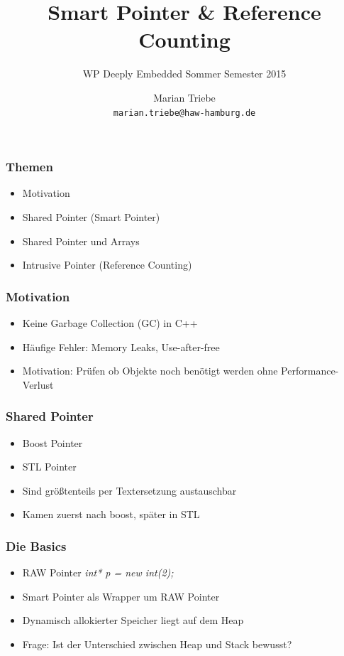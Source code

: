 \documentclass{beamer}
\title{Smart Pointer \& Reference Counting}
\author{
  Marian Triebe\\
  \tiny \texttt{marian.triebe@haw-hamburg.de}
}
\date{} %
\subtitle{WP Deeply Embedded Sommer Semester 2015}
\begin{document}
\begin{frame}
 \titlepage
\end{frame}
 
\begin{frame}
 \frametitle{Themen}
 \begin{itemize}
  \item Motivation
  \item Shared Pointer (Smart Pointer)
  \item Shared Pointer und Arrays
  \item Intrusive Pointer (Reference Counting)
 \end{itemize}
\end{frame}

\begin{frame}
 \frametitle{Motivation}
 \begin{itemize}
 	\item Keine Garbage Collection (GC) in C++
 	\item Häufige Fehler: Memory Leaks, Use-after-free
 	\item Motivation: Prüfen ob Objekte noch benötigt werden ohne
 	Performance-Verlust
 \end{itemize}
\end{frame}


\begin{frame}
 \frametitle{Shared Pointer}
 \begin{itemize}
  \item Boost Pointer
  \item STL Pointer
  \item Sind größtenteils per Textersetzung austauschbar
  \item Kamen zuerst nach boost, später in STL
 \end{itemize}
\end{frame}

\begin{frame}
  \frametitle{Die Basics}
  \begin{itemize}
    \item RAW Pointer \textit{int* p = new int(2);}
    \item Smart Pointer als Wrapper um RAW Pointer
    \item Dynamisch allokierter Speicher liegt auf dem Heap
    \item Frage: Ist der Unterschied zwischen Heap und Stack bewusst?
  \end{itemize}	
\end{frame}
\end{document}
